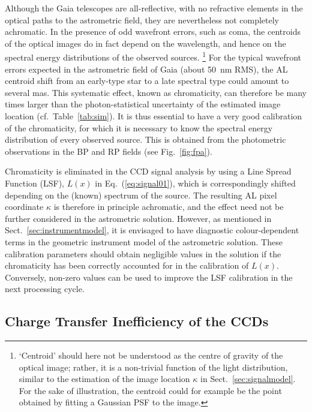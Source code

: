 \documentclass[structabstract]{aa}
\begin{document}
Although the Gaia telescopes are all-reflective, with no refractive elements in the 
optical paths to the astrometric field, they are nevertheless not completely achromatic.
In the presence of odd wavefront errors, such as coma, the centroids of the optical images
do in fact depend on the wavelength, and hence on the spectral energy distributions
of the observed sources.%
\footnote{`Centroid' should here not be understood as the centre of gravity 
of the optical image; rather, it is a non-trivial function of the light distribution,
similar to the estimation of the image location $\kappa$ in Sect.~\ref{sec:signalmodel}.
For the sake of illustration, the centroid could for example be the point
obtained by fitting a Gaussian PSF to the image.}
For the typical wavefront errors expected in the astrometric
field of Gaia (about 50~nm RMS), the AL centroid shift from an early-type star to a late 
spectral type could amount to several mas. This systematic effect, known as chromaticity, 
can therefore be many times larger than the photon-statistical uncertainty of the estimated
image location (cf.\ Table~\ref{tab:sim}). It is thus essential to have a very good calibration
of the chromaticity, for which it is necessary to know the spectral energy distribution of every 
observed source. This is obtained from the photometric observations in the BP and RP
fields (see Fig.~\ref{fig:fpa}).

Chromaticity is eliminated in the CCD signal analysis by using a 
Line Spread Function (LSF), $L(x)$ in Eq.~(\ref{eq:signal01}), which is correspondingly shifted
depending on the (known) spectrum of the source. The resulting AL pixel coordinate
$\kappa$ is therefore in principle achromatic, and the effect need not be further considered 
in the astrometric solution. However, as mentioned in Sect.~\ref{sec:instrumentmodel}, 
it is envisaged to have diagnostic colour-dependent terms in the geometric instrument 
model of the astrometric solution. These calibration parameters should obtain negligible values in 
the solution if the chromaticity has been correctly accounted for in the calibration of $L(x)$.
Conversely, non-zero values can be used to improve the LSF calibration in the next 
processing cycle.


\subsection{Charge Transfer Inefficiency of the CCDs}\label{sec:CTI}
\end{document}
